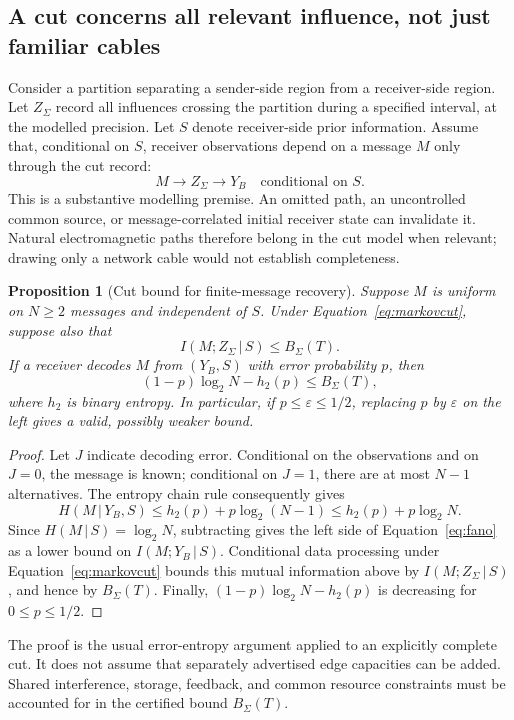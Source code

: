 \documentclass[11pt,a4paper]{article}
\newtheorem{proposition}[theorem]{Proposition}
\theoremstyle{definition}
\theoremstyle{remark}
\newcommand{\given}{\,\vert\,}
\begin{document}
\subsection{A cut concerns all relevant influence, not just familiar cables}
Consider a partition separating a sender-side region from a receiver-side region. Let $Z_\Sigma$ record all influences crossing the partition during a specified interval, at the modelled precision. Let $S$ denote receiver-side prior information. Assume that, conditional on $S$, receiver observations depend on a message $M$ only through the cut record:
\begin{equation}\label{eq:markovcut}
 M\longrightarrow Z_\Sigma\longrightarrow Y_B
 \quad\text{conditional on }S.
\end{equation}
This is a substantive modelling premise. An omitted path, an uncontrolled common source, or message-correlated initial receiver state can invalidate it. Natural electromagnetic paths therefore belong in the cut model when relevant; drawing only a network cable would not establish completeness.

\begin{proposition}[Cut bound for finite-message recovery]\label{prop:cut}
Suppose $M$ is uniform on $N\geq2$ messages and independent of $S$. Under Equation~\eqref{eq:markovcut}, suppose also that
\[
 I(M;Z_\Sigma\given S)\leq B_\Sigma(T).
\]
If a receiver decodes $M$ from $(Y_B,S)$ with error probability $p$, then
\begin{equation}\label{eq:fano}
 (1-p)\log_2N-h_2(p)\leq B_\Sigma(T),
\end{equation}
where $h_2$ is binary entropy. In particular, if $p\leq\varepsilon\leq1/2$, replacing $p$ by $\varepsilon$ on the left gives a valid, possibly weaker bound.
\end{proposition}
\begin{proof}
Let $J$ indicate decoding error. Conditional on the observations and on $J=0$, the message is known; conditional on $J=1$, there are at most $N-1$ alternatives. The entropy chain rule consequently gives
\[
 H(M\given Y_B,S)\leq h_2(p)+p\log_2(N-1)
 \leq h_2(p)+p\log_2N.
\]
Since $H(M\given S)=\log_2N$, subtracting gives the left side of Equation~\eqref{eq:fano} as a lower bound on $I(M;Y_B\given S)$. Conditional data processing under Equation~\eqref{eq:markovcut} bounds this mutual information above by $I(M;Z_\Sigma\given S)$, and hence by $B_\Sigma(T)$. Finally, $(1-p)\log_2N-h_2(p)$ is decreasing for $0\leq p\leq1/2$.
\end{proof}
The proof is the usual error-entropy argument applied to an explicitly complete cut. It does not assume that separately advertised edge capacities can be added. Shared interference, storage, feedback, and common resource constraints must be accounted for in the certified bound $B_\Sigma(T)$.
\end{document}
